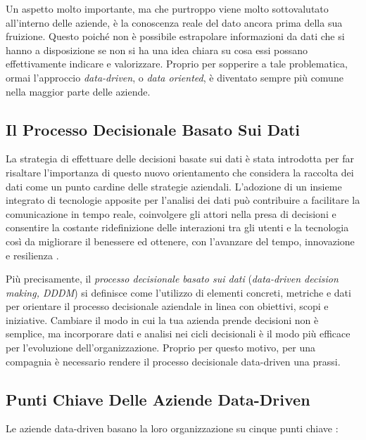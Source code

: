 Un aspetto molto importante, ma che purtroppo viene molto sottovalutato all'interno delle aziende, è la conoscenza reale del dato ancora prima della sua fruizione. Questo poiché non è possibile estrapolare informazioni da dati che si hanno a disposizione se non si ha una idea chiara su cosa essi possano effettivamente indicare e valorizzare. Proprio per sopperire a tale problematica, ormai l'approccio \textit{data-driven}, o \textit{data oriented}, è diventato sempre più comune nella maggior parte delle aziende.

\subsection{Il Processo Decisionale Basato Sui Dati}

La strategia di effettuare delle decisioni basate sui dati è stata introdotta per far risaltare l'importanza di questo nuovo orientamento che considera la raccolta dei dati come un punto cardine delle strategie aziendali. L'adozione di un insieme integrato di tecnologie apposite per l'analisi dei dati può contribuire a facilitare la comunicazione in tempo reale, coinvolgere gli attori nella presa di decisioni e consentire la costante ridefinizione delle interazioni tra gli utenti e la tecnologia così da migliorare il benessere ed ottenere, con l'avanzare del tempo, innovazione e resilienza \cite{emerald_data_driven_orientation}.

Più precisamente, il \textit{processo decisionale basato sui dati} (\textit{data-driven decision making, DDDM}) si definisce come l'utilizzo di elementi concreti, metriche e dati per orientare il processo decisionale aziendale in linea con obiettivi, scopi e iniziative. Cambiare il modo in cui la tua azienda prende decisioni non è semplice, ma incorporare dati e analisi nei cicli decisionali è il modo più efficace per l'evoluzione dell'organizzazione. Proprio per questo motivo, per una compagnia è necessario rendere il processo decisionale data-driven una prassi.

\subsection{Punti Chiave Delle Aziende Data-Driven}
Le aziende data-driven basano la loro organizzazione su cinque punti chiave \cite{researchgate_data_driven_orientation}:

